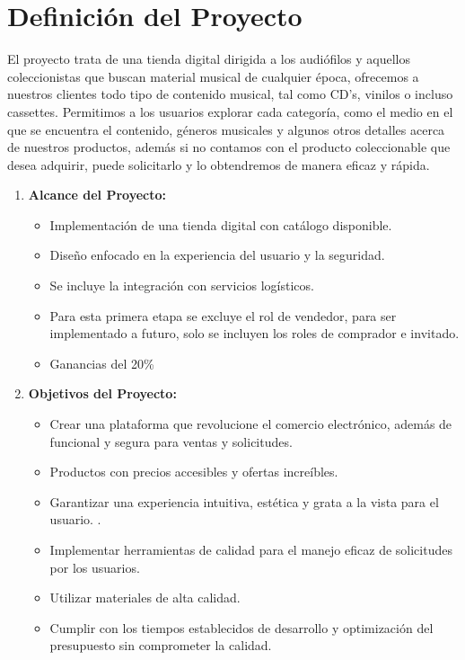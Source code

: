 \documentclass[12pt]{article}
\begin{document}
\section*{Definición del Proyecto}

\noindent El proyecto trata de una tienda digital dirigida a los audiófilos y aquellos coleccionistas que buscan material musical de cualquier época, ofrecemos a nuestros clientes todo tipo de contenido musical, tal como CD's, vinilos o incluso cassettes. 
Permitimos a los usuarios explorar cada categoría, como el medio en el que se encuentra el contenido, géneros musicales y algunos otros detalles acerca de nuestros productos, además si no contamos con el producto coleccionable que desea adquirir, puede solicitarlo y lo obtendremos de manera eficaz y rápida.
\\

\begin{enumerate}
	\item \textbf{Alcance del Proyecto:} 

	\begin{itemize}
		\item Implementación de una tienda digital con catálogo disponible.

		\item Diseño enfocado en la experiencia del usuario y la seguridad.

		\item Se incluye la integración con servicios logísticos.

		\item Para esta primera etapa se excluye el rol de vendedor, para ser implementado a futuro, solo se incluyen los roles de comprador e invitado.

		\item Ganancias del 20\%

	\end{itemize}

	\item \textbf{Objetivos del Proyecto:}

	\begin{itemize}
		\item Crear una plataforma que revolucione el comercio electrónico, además de funcional y segura para ventas y solicitudes.

		\item Productos con precios accesibles y ofertas increíbles.

		\item Garantizar una experiencia intuitiva, estética y grata a la vista para el usuario.
		.
		\item Implementar herramientas de calidad para el manejo eficaz de solicitudes por los usuarios.

		\item Utilizar materiales de alta calidad.

		\item Cumplir con los tiempos establecidos de desarrollo y optimización del presupuesto sin comprometer la calidad.

	\end{itemize}

\end{enumerate}
\end{document}
